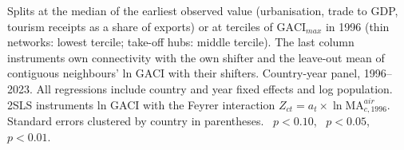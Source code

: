 \begin{table}[H]
\centering
\caption{Mechanism (IV): where is the effect found? Split samples and neighbours (ln market Gini).}
\label{tab:mech_D}
\begin{minipage}{\linewidth}
\centering
{}
\par\vspace{3pt}\begin{flushleft}\footnotesize Splits at the median of the earliest observed value (urbanisation, trade to GDP, tourism receipts as a share of exports) or at terciles of $\mathrm{GACI}_{max}$ in 1996 (thin networks: lowest tercile; take-off hubs: middle tercile). The last column instruments own connectivity with the own shifter and the leave-out mean of contiguous neighbours' ln GACI with their shifters. Country-year panel, 1996--2023. All regressions include country and year fixed effects and log population. 2SLS instruments ln GACI with the Feyrer interaction $Z_{ct}=a_t\times\ln \mathrm{MA}^{air}_{c,1996}$. Standard errors clustered by country in parentheses. \sym{*}~$p<0.10$, \sym{**}~$p<0.05$, \sym{***}~$p<0.01$.\end{flushleft}
\end{minipage}
\end{table}
